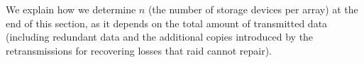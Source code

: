 We explain how we determine $n$ (the number of storage devices per array) at the end of this section, as it depends on the total amount of transmitted data (including redundant data and the additional copies introduced by the retransmissions for recovering losses that \acrshort{raid} cannot repair). 



